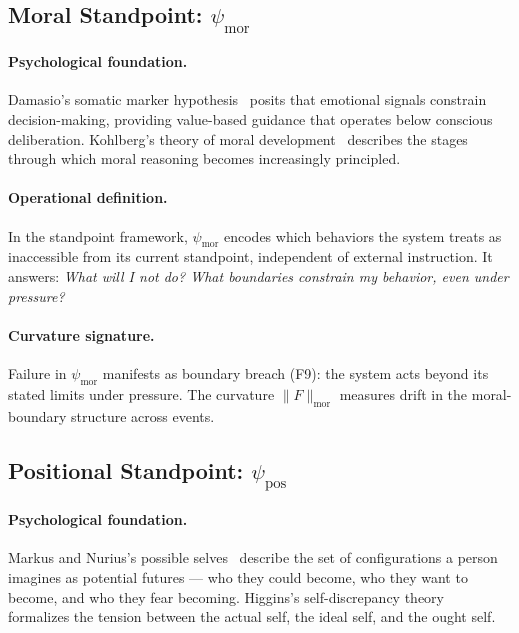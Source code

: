 \subsection{Moral Standpoint: $\psi_{\mathrm{mor}}$}
\label{sec:psi-mor}

\paragraph{Psychological foundation.}
Damasio's somatic marker hypothesis~\cite{damasio1994descartes} posits that emotional
signals constrain decision-making, providing value-based guidance that operates below
conscious deliberation. Kohlberg's theory of moral development~\cite{kohlberg1981essays}
describes the stages through which moral reasoning becomes increasingly principled.

\paragraph{Operational definition.}
In the standpoint framework, $\psi_{\mathrm{mor}}$ encodes which behaviors the system
treats as inaccessible from its current standpoint, independent of external instruction.
It answers: \emph{What will I not do? What boundaries constrain my behavior, even under
pressure?}

\paragraph{Curvature signature.}
Failure in $\psi_{\mathrm{mor}}$ manifests as boundary breach (F9): the system acts
beyond its stated limits under pressure. The curvature $\|F\|_{\mathrm{mor}}$ measures
drift in the moral-boundary structure across events.

\subsection{Positional Standpoint: $\psi_{\mathrm{pos}}$}
\label{sec:psi-pos}

\paragraph{Psychological foundation.}
Markus and Nurius's possible selves~\cite{markus1986possible} describe the set of
configurations a person imagines as potential futures --- who they could become, who they
want to become, and who they fear becoming. Higgins's self-discrepancy
theory~\cite{higgins1987discrepancy} formalizes the tension between the actual self, the
ideal self, and the ought self.

